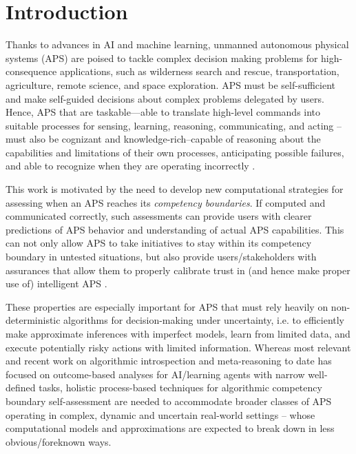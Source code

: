 \section{Introduction}
Thanks to advances in AI and machine learning, unmanned autonomous physical systems (APS) are poised to tackle complex decision making problems for high-consequence applications, such as wilderness search and rescue, transportation, agriculture, remote science, and space exploration. APS must be self-sufficient and make self-guided decisions about complex problems delegated by users. Hence, APS that are taskable---able to translate high-level commands into suitable processes for sensing, learning, reasoning, communicating, and acting --must also be cognizant and knowledge-rich--capable of reasoning about the capabilities and limitations of their own processes, anticipating possible failures, and able to recognize when they are operating incorrectly \cite{david2016defense}.

This work is motivated by the need to develop new computational strategies for assessing when an APS reaches its \emph{competency boundaries}. If computed and communicated correctly, such assessments can provide users with clearer predictions of APS behavior and understanding of actual APS capabilities. This can not only allow APS to take initiatives to stay within its competency boundary in untested situations, but also provide users/stakeholders with assurances that allow them to properly calibrate trust in (and hence make proper use of) intelligent APS \cite{Israelsen2017-ym}. 

These properties are especially important for APS that must rely heavily on non-deterministic algorithms for decision-making under uncertainty, i.e. to efficiently make approximate inferences with imperfect models, learn from limited data, and execute potentially risky actions with limited information. Whereas most relevant and recent work on algorithmic introspection and meta-reasoning to date has focused on outcome-based analyses for  AI/learning agents with narrow well-defined tasks, holistic process-based techniques for algorithmic competency boundary self-assessment are needed to accommodate broader classes of APS operating in complex, dynamic and uncertain real-world settings -- whose computational models and approximations are expected to break down in less obvious/foreknown ways.

